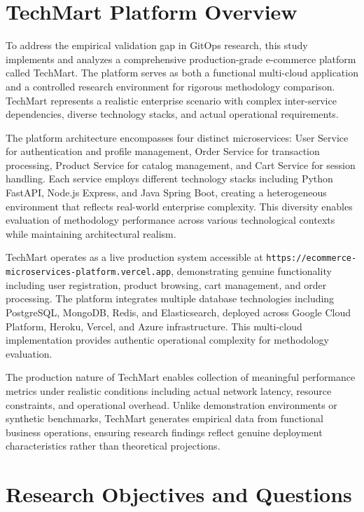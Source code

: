 \section{TechMart Platform Overview}

To address the empirical validation gap in GitOps research, this study implements and analyzes a comprehensive production-grade e-commerce platform called TechMart. The platform serves as both a functional multi-cloud application and a controlled research environment for rigorous methodology comparison. TechMart represents a realistic enterprise scenario with complex inter-service dependencies, diverse technology stacks, and actual operational requirements.

The platform architecture encompasses four distinct microservices: User Service for authentication and profile management, Order Service for transaction processing, Product Service for catalog management, and Cart Service for session handling. Each service employs different technology stacks including Python FastAPI, Node.js Express, and Java Spring Boot, creating a heterogeneous environment that reflects real-world enterprise complexity. This diversity enables evaluation of methodology performance across various technological contexts while maintaining architectural realism.

TechMart operates as a live production system accessible at \texttt{https://ecommerce-microservices-platform.vercel.app}, demonstrating genuine functionality including user registration, product browsing, cart management, and order processing. The platform integrates multiple database technologies including PostgreSQL, MongoDB, Redis, and Elasticsearch, deployed across Google Cloud Platform, Heroku, Vercel, and Azure infrastructure. This multi-cloud implementation provides authentic operational complexity for methodology evaluation.

The production nature of TechMart enables collection of meaningful performance metrics under realistic conditions including actual network latency, resource constraints, and operational overhead. Unlike demonstration environments or synthetic benchmarks, TechMart generates empirical data from functional business operations, ensuring research findings reflect genuine deployment characteristics rather than theoretical projections.

\section{Research Objectives and Questions}

